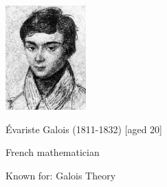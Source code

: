 \begin{frame}
\hfil\hfil \includegraphics[height=4cm]{../../modules/history/pictures/galois.jpg}

\hfil\hfil \'Evariste Galois (1811-1832) [aged 20]

\hfil\hfil French mathematician

\hfil\hfil Known for: Galois Theory


\end{frame}